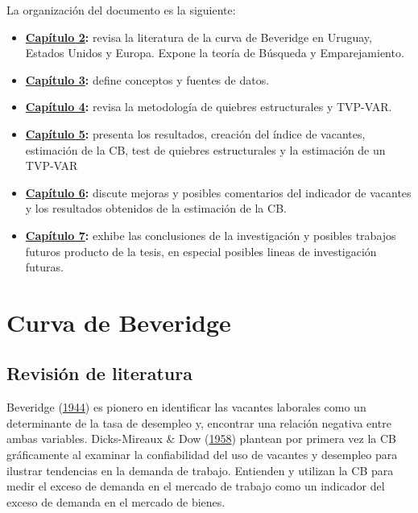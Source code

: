 \documentclass[12pt,oneside]{reedthesis}
\begin{document}
La organización del documento es la siguiente:
\begin{itemize}
\item
  \textbf{\protect\hyperlink{cap:Fundamentos}{Capítulo 2}:} revisa la literatura de la curva de Beveridge en Uruguay, Estados Unidos y Europa. Expone la teoría de Búsqueda y Emparejamiento.
\item
  \textbf{\protect\hyperlink{cap:Datos}{Capítulo 3}:} define conceptos y fuentes de datos.
\item
  \textbf{\protect\hyperlink{cap:Metodologuxeda}{Capítulo 4}:} revisa la metodología de quiebres estructurales y TVP-VAR.
\item
  \textbf{\protect\hyperlink{cap:Resultados}{Capítulo 5}:} presenta los resultados, creación del índice de vacantes, estimación de la CB, test de quiebres estructurales y la estimación de un TVP-VAR
\item
  \textbf{\protect\hyperlink{cap:Discusion}{Capítulo 6}:} discute mejoras y posibles comentarios del indicador de vacantes y los resultados obtenidos de la estimación de la CB.
\item
  \textbf{\protect\hyperlink{cap:Conclusiones}{Capítulo 7}:} exhibe las conclusiones de la investigación y posibles trabajos futuros producto de la tesis, en especial posibles lineas de investigación futuras.
\end{itemize}
\hypertarget{cap:Fundamentos}{%
\chapter{Curva de Beveridge}\label{cap:Fundamentos}}

\hypertarget{revisiuxf3n-de-literatura}{%
\section{Revisión de literatura}\label{revisiuxf3n-de-literatura}}

Beveridge (\protect\hyperlink{ref-Beveridge}{1944}) es pionero en identificar las vacantes laborales como un determinante de la tasa de desempleo y, encontrar una relación negativa entre ambas variables. Dicks-Mireaux \& Dow (\protect\hyperlink{ref-Dicks-Mireaux1958}{1958}) plantean por primera vez la CB gráficamente al examinar la confiabilidad del uso de vacantes y desempleo para ilustrar tendencias en la demanda de trabajo. Entienden y utilizan la CB para medir el exceso de demanda en el mercado de trabajo como un indicador del exceso de demanda en el mercado de bienes.
\end{document}
